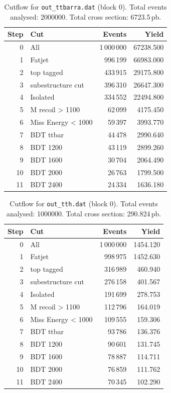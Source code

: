 \documentclass{article}
\begin{document}
\begin{table}[H]
\centering
\begin{tabular}{r l r r}
\toprule
Step & Cut & Events & Yield \\
\midrule
0 & All & 1\,000\,000 & 67238.500 \\
1 & Fatjet & 996\,199 & 66983.000 \\
2 & top tagged & 433\,915 & 29175.800 \\
3 & subestructure cut & 396\,310 & 26647.300 \\
4 & Isolated & 334\,552 & 22494.800 \\
5 & M recoil > 1100 & 62\,099 & 4175.450 \\
6 & Miss Energy < 1000 & 59\,397 & 3993.770 \\
7 & BDT ttbar & 44\,478 & 2990.640 \\
8 & BDT 1200 & 43\,119 & 2899.260 \\
9 & BDT 1600 & 30\,704 & 2064.490 \\
10 & BDT 2000 & 26\,763 & 1799.500 \\
11 & BDT 2400 & 24\,334 & 1636.180 \\
\bottomrule
\end{tabular}
\caption{Cutflow for \texttt{out\_ttbarra.dat} (block 0). Total events analysed: 2000000. Total cross section: 6723.5\,pb.}
\label{tab:cutflow-out-ttbarra-dat}
\end{table}

\begin{table}[H]
\centering
\begin{tabular}{r l r r}
\toprule
Step & Cut & Events & Yield \\
\midrule
0 & All & 1\,000\,000 & 1454.120 \\
1 & Fatjet & 998\,975 & 1452.630 \\
2 & top tagged & 316\,989 & 460.940 \\
3 & subestructure cut & 276\,158 & 401.567 \\
4 & Isolated & 191\,699 & 278.753 \\
5 & M recoil > 1100 & 112\,796 & 164.019 \\
6 & Miss Energy < 1000 & 109\,555 & 159.306 \\
7 & BDT ttbar & 93\,786 & 136.376 \\
8 & BDT 1200 & 90\,601 & 131.745 \\
9 & BDT 1600 & 78\,887 & 114.711 \\
10 & BDT 2000 & 76\,859 & 111.762 \\
11 & BDT 2400 & 70\,345 & 102.290 \\
\bottomrule
\end{tabular}
\caption{Cutflow for \texttt{out\_tth.dat} (block 0). Total events analysed: 1000000. Total cross section: 290.824\,pb.}
\label{tab:cutflow-out-tth-dat}
\end{table}
\end{document}

